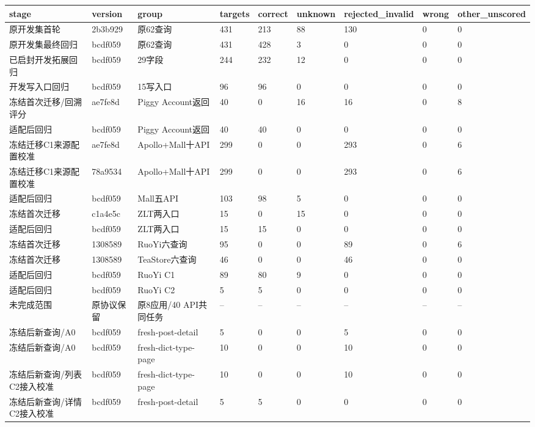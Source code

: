 \begin{tabular}{lllllllll}
\hline
stage & version & group & targets & correct & unknown & rejected\_invalid & wrong & other\_unscored \\
\hline
原开发集首轮 & 2b3b929 & 原62查询 & 431 & 213 & 88 & 130 & 0 & 0 \\
原开发集最终回归 & bcdf059 & 原62查询 & 431 & 428 & 3 & 0 & 0 & 0 \\
已启封开发拓展回归 & bcdf059 & 29字段 & 244 & 232 & 12 & 0 & 0 & 0 \\
开发写入口回归 & bcdf059 & 15写入口 & 96 & 96 & 0 & 0 & 0 & 0 \\
冻结首次迁移/回溯评分 & ae7fe8d & Piggy Account返回 & 40 & 0 & 16 & 16 & 0 & 8 \\
适配后回归 & bcdf059 & Piggy Account返回 & 40 & 40 & 0 & 0 & 0 & 0 \\
冻结迁移C1来源配置校准 & ae7fe8d & Apollo+Mall十API & 299 & 0 & 0 & 293 & 0 & 6 \\
冻结迁移C1来源配置校准 & 78a9534 & Apollo+Mall十API & 299 & 0 & 0 & 293 & 0 & 6 \\
适配后回归 & bcdf059 & Mall五API & 103 & 98 & 5 & 0 & 0 & 0 \\
冻结首次迁移 & c1a4e5c & ZLT两入口 & 15 & 0 & 15 & 0 & 0 & 0 \\
适配后回归 & bcdf059 & ZLT两入口 & 15 & 15 & 0 & 0 & 0 & 0 \\
冻结首次迁移 & 1308589 & RuoYi六查询 & 95 & 0 & 0 & 89 & 0 & 6 \\
冻结首次迁移 & 1308589 & TeaStore六查询 & 46 & 0 & 0 & 46 & 0 & 0 \\
适配后回归 & bcdf059 & RuoYi C1 & 89 & 80 & 9 & 0 & 0 & 0 \\
适配后回归 & bcdf059 & RuoYi C2 & 5 & 5 & 0 & 0 & 0 & 0 \\
未完成范围 & 原协议保留 & 原8应用/40 API共同任务 & -- & -- & -- & -- & -- & -- \\
冻结后新查询/A0 & bcdf059 & fresh-post-detail & 5 & 0 & 0 & 5 & 0 & 0 \\
冻结后新查询/A0 & bcdf059 & fresh-dict-type-page & 10 & 0 & 0 & 10 & 0 & 0 \\
冻结后新查询/列表C2接入校准 & bcdf059 & fresh-dict-type-page & 10 & 0 & 0 & 10 & 0 & 0 \\
冻结后新查询/详情C2接入校准 & bcdf059 & fresh-post-detail & 5 & 5 & 0 & 0 & 0 & 0 \\
\hline
\end{tabular}
